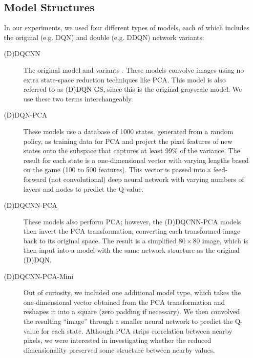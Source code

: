 \documentclass[11pt]{article}
\begin{document}
\subsection{Model Structures}
\label{subsec:model_structure}

In our experiments, we used four different types of models, each of which includes the original (e.g. DQN) and double (e.g. DDQN) network variants: 

\begin{description}
    \item[(D)DQCNN] The original model \cite{mnih2013playing, mnih2015human} and variants \cite{van2016deep}. These models convolve images using no extra state-space reduction techniques like PCA. This model is also referred to as (D)DQN-GS, since this is the original grayscale model. We use these two terms interchangeably.
    
    \item[(D)DQN-PCA] These models use a database of 1000 states, generated from a random policy, as training data for PCA and project the pixel features of new states onto the subspace that captures at least 99\% of the variance. The result for each state is a one-dimensional vector with varying lengths based on the game (100 to 500 features). This vector is passed into a feed-forward (not convolutional) deep neural network with varying numbers of layers and nodes to predict the Q-value.
    
    \item[(D)DQCNN-PCA] These models also perform PCA; however, the (D)DQCNN-PCA models then invert the PCA transformation, converting each transformed image back to its original space. The result is a simplified $80 \times 80$ image, which is then input into a model with the same network structure as the original (D)DQN.
    
    \item[(D)DQCNN-PCA-Mini] Out of curiosity, we included one additional model type, which takes the one-dimensional vector obtained from the PCA transformation and reshapes it into a square (zero padding if necessary). We then convolved the resulting ``image'' through a smaller neural network to predict the Q-value for each state. Although PCA strips correlation between nearby pixels, we were interested in investigating whether the reduced dimensionality preserved some structure between nearby values.
\end{description}
\end{document}
